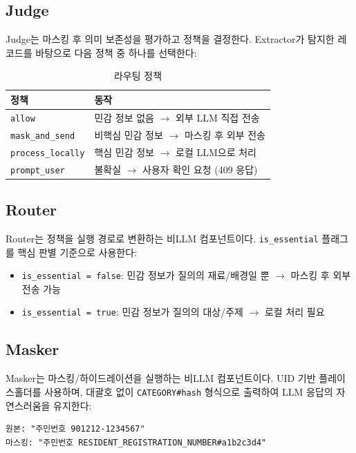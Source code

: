 \documentclass[11pt,a4paper]{article}
\begin{document}
\subsection{Judge}

Judge는 마스킹 후 의미 보존성을 평가하고 정책을 결정한다. Extractor가 탐지한 레코드를 바탕으로 다음 정책 중 하나를 선택한다:

\begin{table}[h]
\centering
\begin{tabular}{@{}ll@{}}
\toprule
정책 & 동작 \\
\midrule
\texttt{allow} & 민감 정보 없음 $\rightarrow$ 외부 LLM 직접 전송 \\
\texttt{mask\_and\_send} & 비핵심 민감 정보 $\rightarrow$ 마스킹 후 외부 전송 \\
\texttt{process\_locally} & 핵심 민감 정보 $\rightarrow$ 로컬 LLM으로 처리 \\
\texttt{prompt\_user} & 불확실 $\rightarrow$ 사용자 확인 요청 (409 응답) \\
\bottomrule
\end{tabular}
\caption{라우팅 정책}
\end{table}

\subsection{Router}

Router는 정책을 실행 경로로 변환하는 비LLM 컴포넌트이다. \texttt{is\_essential} 플래그를 핵심 판별 기준으로 사용한다:

\begin{itemize}[nosep]
  \item \texttt{is\_essential = false}: 민감 정보가 질의의 재료/배경일 뿐 $\rightarrow$ 마스킹 후 외부 전송 가능
  \item \texttt{is\_essential = true}: 민감 정보가 질의의 대상/주제 $\rightarrow$ 로컬 처리 필요
\end{itemize}

\subsection{Masker}

Masker는 마스킹/하이드레이션을 실행하는 비LLM 컴포넌트이다. UID 기반 플레이스홀더를 사용하며, 대괄호 없이 \texttt{CATEGORY\#hash} 형식으로 출력하여 LLM 응답의 자연스러움을 유지한다:

\begin{verbatim}
원본: "주민번호 901212-1234567"
마스킹: "주민번호 RESIDENT_REGISTRATION_NUMBER#a1b2c3d4"
\end{verbatim}
\end{document}
